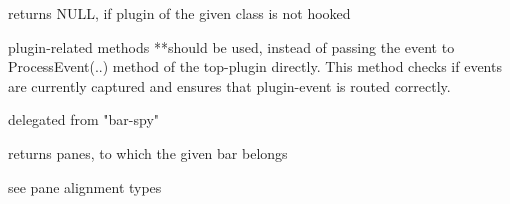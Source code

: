 returns NULL, if plugin of the given class is not hooked


\label{wxframelayoutfirepluginevent}


plugin-related methods **should be used, instead of passing the event to ProcessEvent(..) method
of the top-plugin directly. This method checks if events are currently
captured and ensures that plugin-event is routed correctly.


\label{wxframelayoutforwardmouseevent}


delegated from "bar-spy"


\label{wxframelayoutgetbarpane}


returns panes, to which the given bar belongs


\label{wxframelayoutgetbars}



\label{wxframelayoutgetclientheight}



\label{wxframelayoutgetclientrect}



\label{wxframelayoutgetclientwidth}



\label{wxframelayoutgetframeclient}



\label{wxframelayoutgetpane}


see pane alignment types


\label{wxframelayoutgetpaneproperties}

